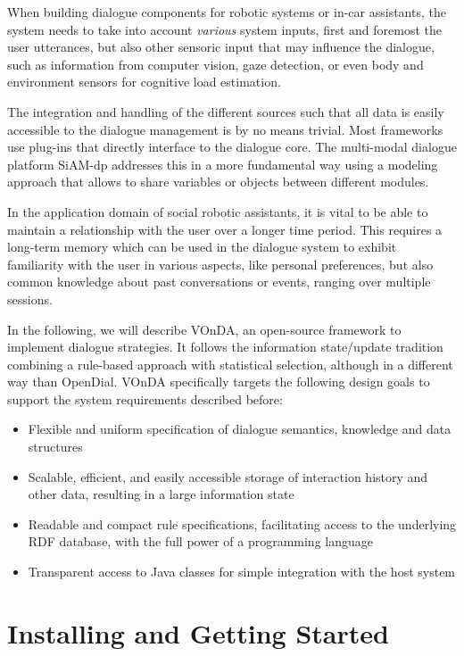 \documentclass[a4paper]{report}
\newcommand{\vonda}{VOnDA\xspace}
\begin{document}
When building dialogue components for robotic systems or in-car assistants, the system
needs to take into account \emph{various} system inputs, first and foremost the
user utterances, but also other sensoric input that may influence the dialogue,
such as information from computer vision, gaze detection, or even body and
environment sensors for cognitive load estimation.

The integration and handling of the different sources such that all data is
easily accessible to the dialogue management is by no means trivial. Most
frameworks use plug-ins that directly interface to the dialogue core. The
multi-modal dialogue platform SiAM-dp \citep{nesselrath2014siam}
addresses this in a more fundamental way using a modeling approach that allows
to share variables or objects between different modules.

In the application domain of social robotic assistants, it is vital to be able
to maintain a relationship with the user over a longer time period. This requires a long-term
memory which can be used in the dialogue system to exhibit familiarity with the
user in various aspects, like personal preferences, but also common knowledge
about past conversations or events, ranging over multiple sessions.

In the following, we will describe \vonda, an open-source framework to
implement dialogue strategies. It follows the information state/update
tradition \citep{traum2003information}
combining a rule-based approach with statistical selection, although in a
different way than OpenDial. \vonda specifically targets the following design
goals to support the system requirements described before:

\begin{itemize}
  \addtolength{\itemsep}{-.6\itemsep}
\item Flexible and uniform specification of dialogue semantics, knowledge and
  data structures
\item Scalable, efficient, and easily accessible storage of interaction history
  and other data, resulting in a large information state
\item Readable and compact rule specifications, facilitating access to the
  underlying RDF database, with the full power of a programming language
\item Transparent access to Java classes for simple integration with the host
  system
\end{itemize}
\fi



%

\chapter{Installing and Getting Started}









\end{document}
